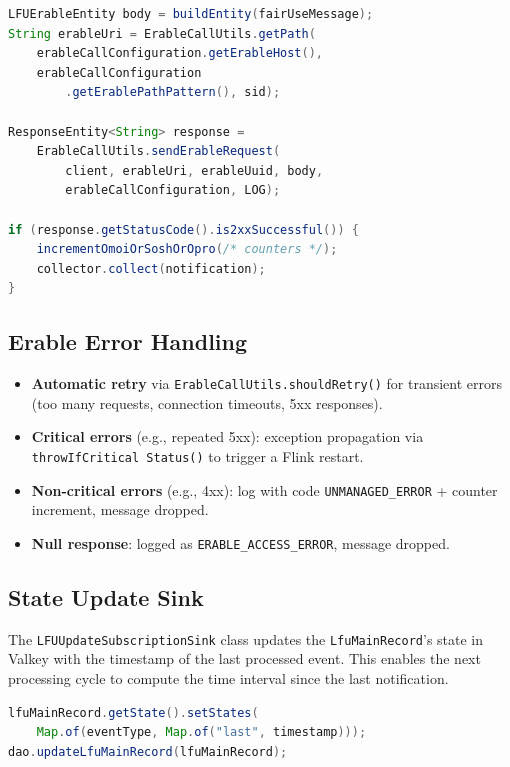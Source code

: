 \begin{lstlisting}[language=Java, caption={HTTP call to Erable}, breaklines=true]
LFUErableEntity body = buildEntity(fairUseMessage);
String erableUri = ErableCallUtils.getPath(
    erableCallConfiguration.getErableHost(),
    erableCallConfiguration
        .getErablePathPattern(), sid);

ResponseEntity<String> response =
    ErableCallUtils.sendErableRequest(
        client, erableUri, erableUuid, body,
        erableCallConfiguration, LOG);

if (response.getStatusCode().is2xxSuccessful()) {
    incrementOmoiOrSoshOrOpro(/* counters */);
    collector.collect(notification);
}
\end{lstlisting}

\subsection{Erable Error Handling}

\begin{itemize}
    \item \textbf{Automatic retry} via \texttt{ErableCallUtils.shouldRetry()} for transient errors (too many requests, connection timeouts, 5xx responses).
    \item \textbf{Critical errors} (e.g., repeated 5xx): exception propagation via \texttt{throwIfCritical Status()} to trigger a Flink restart.
    \item \textbf{Non-critical errors} (e.g., 4xx): log with code \texttt{UNMANAGED\_ERROR} + counter increment, message dropped.
    \item \textbf{Null response}: logged as \texttt{ERABLE\_ACCESS\_ERROR}, message dropped.
\end{itemize}

\subsection{State Update Sink}

The \texttt{LFUUpdateSubscriptionSink} class updates the \texttt{LfuMainRecord}'s state in Valkey with the timestamp of the last processed event. This enables the next processing cycle to compute the time interval since the last notification.

\begin{lstlisting}[language=Java, caption={State update in Valkey}]
lfuMainRecord.getState().setStates(
    Map.of(eventType, Map.of("last", timestamp)));
dao.updateLfuMainRecord(lfuMainRecord);
\end{lstlisting}

